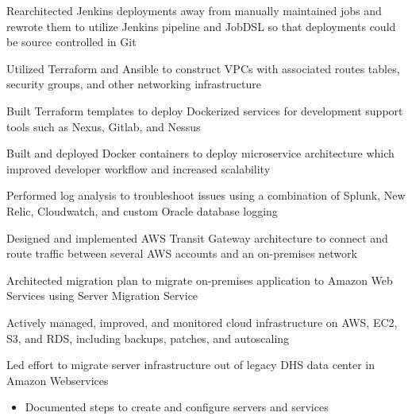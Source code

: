 \begin{cventries}
{\begin{cvitems}
        \item {Rearchitected Jenkins deployments away from manually maintained jobs and rewrote them to utilize Jenkins pipeline and JobDSL so that deployments could be source controlled in Git}
        \item {Utilized Terraform and Ansible to construct VPCs with associated routes tables, security groups, and other networking infrastructure}
        \item {Built Terraform templates to deploy Dockerized services for development support tools such as Nexus, Gitlab, and Nessus}
        \item {Built and deployed Docker containers to deploy microservice architecture which improved developer workflow and increased scalability}
        \item {Performed log analysis to troubleshoot issues using a combination of Splunk, New Relic, Cloudwatch, and custom Oracle database logging}
        \item {Designed and implemented AWS Transit Gateway architecture to connect and route traffic between several AWS accounts and an on-premises network}
        \item {Architected migration plan to migrate on-premises application to Amazon Web Services using Server Migration Service}
        \item {Actively managed, improved, and monitored cloud infrastructure on AWS, EC2, S3, and RDS, including backups, patches, and autoscaling}
        \item {Led effort to migrate server infrastructure out of legacy DHS data center in Amazon Webservices}
        \begin{itemize}
          \item {Documented steps to create and configure servers and services}

\end{itemize}
\end{cvitems}}
\end{cventries}
